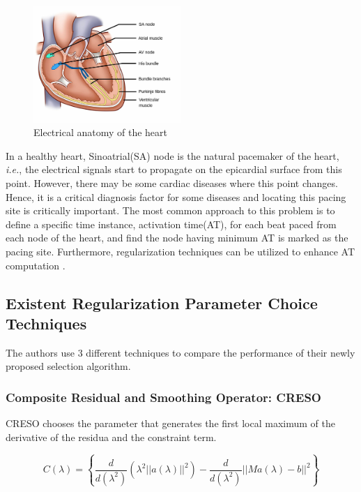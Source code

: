\documentclass[draftcls, onecolumn, journal]{IEEEtran}
\begin{document}
\begin{figure}[h]
\centering
\includegraphics[width=0.5\textwidth]{../images/SA_Node.png}
\caption{Electrical anatomy of the heart}\label{fig:SANODE}
\end{figure}

In a healthy heart, Sinoatrial(SA) node is the natural pacemaker of the heart, \textit{i.e.}, the electrical signals start to propagate on the epicardial surface from this point. However, there may be some cardiac diseases where this point changes. Hence, it is a critical diagnosis factor for some diseases and locating this pacing site is critically important. The most common approach to this problem is to define a specific time instance, activation time(AT), for each beat paced from each node of the heart, and find the node having minimum AT is marked as the pacing site. Furthermore, regularization techniques can be utilized to enhance AT computation \cite*{erem2013using}.

\newpage
\subsection{Existent Regularization Parameter Choice Techniques}\label{subsec:paramselect}

The authors use 3 different techniques to compare the performance of their newly proposed selection algorithm. 

\subsubsection{Composite Residual and Smoothing Operator: CRESO}

CRESO \cite{colli1985mathematical} chooses the parameter that generates the first local maximum of the derivative of the residua and the constraint term. 

\begin{equation}
    C(\lambda) = \left\{ \frac{d}{d(\lambda^2)}(\lambda^2||a(\lambda)||^2) -  \frac{d}{d(\lambda^2)}||Ma(\lambda) - b||^2 \right\}
\end{equation}
\end{document}
